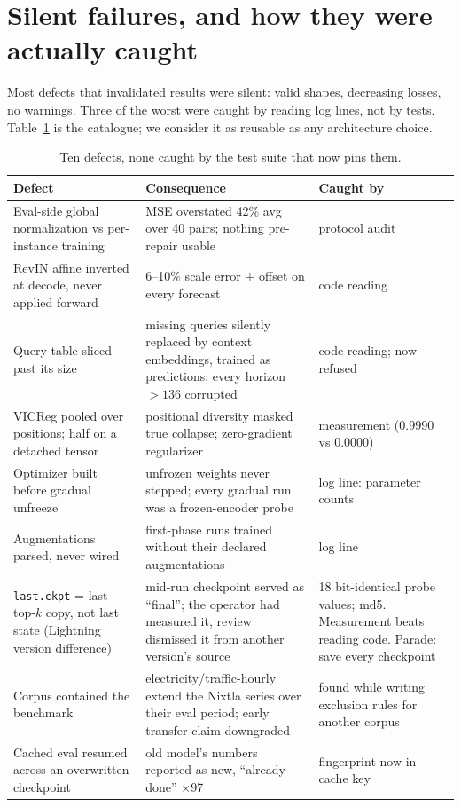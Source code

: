 \section{Silent failures, and how they were actually caught}
\label{app:pitfalls}

Most defects that invalidated results were silent: valid shapes, decreasing
losses, no warnings. Three of the worst were caught by reading log lines,
not by tests. Table~\ref{tab:pitfalls} is the catalogue; we consider it as
reusable as any architecture choice.

\begin{table}[h]
\centering
\small
\begin{tabular}{p{4.6cm}p{5.4cm}p{4.0cm}}
\toprule
Defect & Consequence & Caught by \\
\midrule
Eval-side global normalization vs per-instance training & MSE overstated 42\% avg over 40 pairs; nothing pre-repair usable & protocol audit \\
RevIN affine inverted at decode, never applied forward & 6--10\% scale error + offset on every forecast & code reading \\
Query table sliced past its size & missing queries silently replaced by context embeddings, trained as predictions; every horizon $>136$ corrupted & code reading; now refused \\
VICReg pooled over positions; half on a detached tensor & positional diversity masked true collapse; zero-gradient regularizer & measurement (0.9990 vs 0.0000) \\
Optimizer built before gradual unfreeze & unfrozen weights never stepped; every gradual run was a frozen-encoder probe & log line: parameter counts \\
Augmentations parsed, never wired & first-phase runs trained without their declared augmentations & log line \\
\texttt{last.ckpt} = last top-$k$ copy, not last state (Lightning version difference) & mid-run checkpoint served as ``final''; the operator had measured it, review dismissed it from another version's source & 18 bit-identical probe values; md5. Measurement beats reading code. Parade: save every checkpoint \\
Corpus contained the benchmark & electricity/traffic-hourly extend the Nixtla series over their eval period; early transfer claim downgraded & found while writing exclusion rules for another corpus \\
Cached eval resumed across an overwritten checkpoint & old model's numbers reported as new, ``already done'' $\times$97 & fingerprint now in cache key \\
\bottomrule
\end{tabular}
\caption{Ten defects, none caught by the test suite that now pins them.}
\label{tab:pitfalls}
\end{table}

